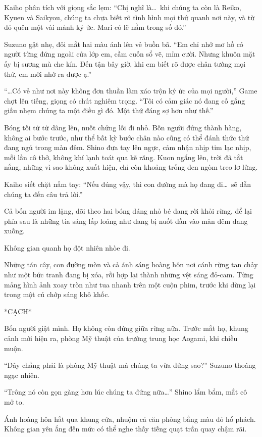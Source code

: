 \documentclass[../main.tex]{subfiles}
\begin{document}
Kaiho phân tích với giọng sắc lẹm: ``Chị nghĩ là\dots\ khi chúng ta còn là Reiko, Kyuen và Saikyou, chúng ta chưa biết rõ tình hình mọi thứ quanh nơi này, và từ đó quên một vài mảnh ký ức. Mari có lẽ nằm trong số đó.''

Suzuno gật nhẹ, đôi mắt hai màu ánh lên vẻ buồn bã. ``Em chỉ nhớ mơ hồ có người từng đứng ngoài cửa lớp em, cầm cuốn sổ vẽ, mỉm cười. Nhưng khuôn mặt ấy bị sương mù che kín. Đến tận bây giờ, khi em biết rõ được chân tướng mọi thứ, em mới nhớ ra được ạ.''

``\dots Có vẻ như nơi này không đơn thuần làm xáo trộn ký ức của mọi người,'' Game chợt lên tiếng, giọng có chút nghiêm trọng. ``Tôi có cảm giác nó đang cố gắng giấu nhẹm chúng ta một điều gì đó. Một thứ đáng sợ hơn như thế.''

Bóng tối từ từ dâng lên, nuốt chửng lối đi nhỏ. Bốn người đứng thành hàng, không ai bước trước, như thể bất kỳ bước chân nào cũng có thể đánh thức thứ đang ngủ trong màn đêm. Shino đưa tay lên ngực, cảm nhận nhịp tim lạc nhịp, mỗi lần cô thở, không khí lạnh toát qua kẽ răng. Kuon ngẩng lên, trời đã tắt nắng, những vì sao không xuất hiện, chỉ còn khoảng trống đen ngòm treo lơ lửng.

Kaiho siết chặt nắm tay: ``Nếu đúng vậy, thì con đường mà họ đang đi\dots\ sẽ dẫn chúng ta đến câu trả lời.''

Cả bốn người im lặng, dõi theo hai bóng dáng nhỏ bé đang rời khỏi rừng, để lại phía sau là những tia sáng lấp loáng như đang bị nuốt dần vào màn đêm đang xuống.

Không gian quanh họ đột nhiên nhòe đi.

Những tán cây, con đường mòn và cả ánh sáng hoàng hôn nơi cánh rừng tan chảy như một bức tranh đang bị xóa, rồi hợp lại thành những vệt sáng đỏ-cam. Từng mảng hình ảnh xoay tròn như tua nhanh trên một cuộn phim, trước khi dừng lại trong một cú chớp sáng khô khốc.

*CẠCH*

Bốn người giật mình. Họ không còn đứng giữa rừng nữa.
Trước mắt họ, khung cảnh mới hiện ra, phòng Mỹ thuật của trường trung học Aogami, khi chiều muộn.

``Đây chẳng phải là phòng Mỹ thuật mà chúng ta vừa đứng sao?'' Suzuno thoáng ngạc nhiên.

``Trông nó còn gọn gàng hơn lúc chúng ta đứng nữa\dots'' Shino lẩm bẩm, mắt cô mở to.

Ánh hoàng hôn hắt qua khung cửa, nhuộm cả căn phòng bằng màu đỏ hổ phách. Không gian yên ắng đến mức có thể nghe thấy tiếng quạt trần quay chậm rãi.
\end{document}
